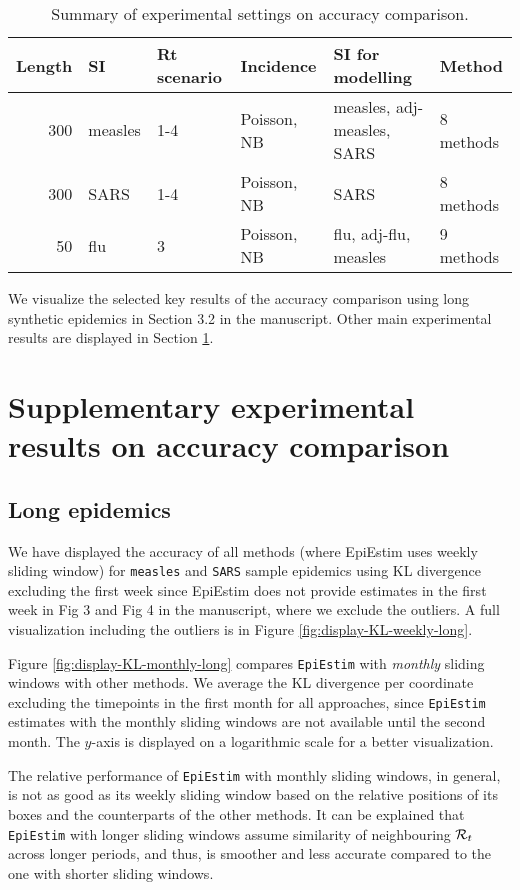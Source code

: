 \documentclass[
]{article}
\begin{document}
\begin{table}
\centering
\caption{\label{tab:df-exp}Summary of experimental settings on accuracy comparison.}
\centering
\begin{tabular}[t]{rlllll}
\toprule
Length & SI & Rt scenario & Incidence & SI for modelling & Method\\
\midrule
300 & measles & 1-4 & Poisson, NB & measles, adj-measles, SARS & 8 methods\\
300 & SARS & 1-4 & Poisson, NB & SARS & 8 methods\\
50 & flu & 3 & Poisson, NB & flu, adj-flu, measles & 9 methods\\
\bottomrule
\end{tabular}
\end{table}

We visualize the selected key results of the accuracy comparison using long synthetic
epidemics in Section 3.2 in the manuscript. Other main experimental results are displayed in
Section \ref{sec:exp-accuracy}.

\clearpage

\section{Supplementary experimental results on accuracy comparison}\label{sec:exp-accuracy}

\subsection{Long epidemics}\label{long-epidemics}

We have displayed the accuracy of all methods (where EpiEstim uses weekly
sliding window) for \texttt{measles} and \texttt{SARS} sample epidemics using KL divergence
excluding the first week since EpiEstim does not provide estimates in the first
week in Fig 3 and Fig 4 in the manuscript, where we exclude the outliers.
A full visualization including the outliers is in Figure
\ref{fig:display-KL-weekly-long}.

Figure \ref{fig:display-KL-monthly-long} compares \texttt{EpiEstim} with \emph{monthly}
sliding windows with other methods. We average the KL divergence per coordinate
excluding the timepoints in the first month for all approaches, since \texttt{EpiEstim} 
estimates with the monthly sliding windows are not available until the second month.
The \(y\)-axis is displayed on a logarithmic scale for a better visualization.

The relative performance of \texttt{EpiEstim} with monthly sliding windows, in general,
is not as good as its weekly sliding window based on the relative positions of
its boxes and the counterparts of the other methods. It can be explained that
\texttt{EpiEstim} with longer sliding windows assume similarity of neighbouring \(\mathcal{R}_t\)
across longer periods, and thus, is smoother and less accurate compared to the
one with shorter sliding windows.
\end{document}
